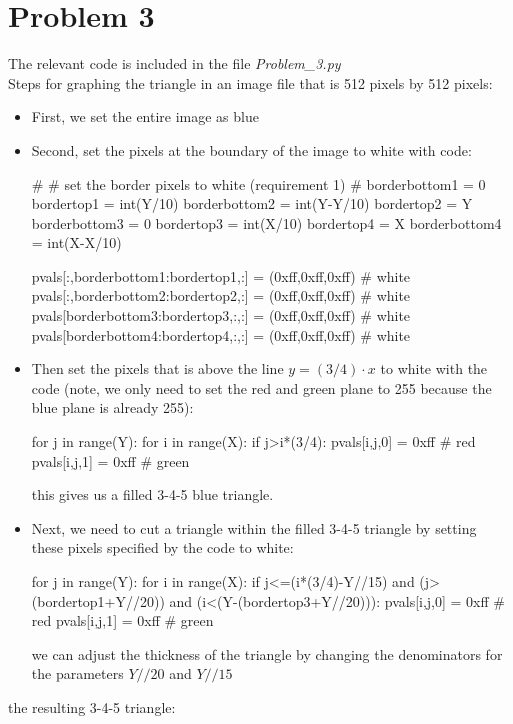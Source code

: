 \documentclass[20pt,letterpaper]{article}
\begin{document}
\section{Problem 3}
The relevant code is included in the file \textit{Problem\_3.py}\\
Steps for graphing the triangle in an image file that is 512 pixels by 512 pixels:
\begin{itemize}
	\item First, we set the entire image as blue
	\item Second, set the pixels at the boundary of the image to white with code:
	\begin{python}
		# 
		# set the border pixels to white (requirement 1)
		# 
		borderbottom1 = 0
		bordertop1 = int(Y/10)
		borderbottom2 = int(Y-Y/10)
		bordertop2 = Y
		borderbottom3 = 0
		bordertop3 = int(X/10)
		bordertop4 = X
		borderbottom4 = int(X-X/10)
		
		pvals[:,borderbottom1:bordertop1,:] = (0xff,0xff,0xff)  # white
		pvals[:,borderbottom2:bordertop2,:] = (0xff,0xff,0xff)  # white
		pvals[borderbottom3:bordertop3,:,:] = (0xff,0xff,0xff)  # white
		pvals[borderbottom4:bordertop4,:,:] = (0xff,0xff,0xff)  # white
	\end{python}
	\item Then set the pixels that is above the line $y = (3/4)\cdot x$ to white with the code (note, we only need to set the red and green plane to 255 because the blue plane is already 255):
	\begin{python}
		for j in range(Y):
			for i in range(X):
				if j>i*(3/4):
					pvals[i,j,0] = 0xff  # red
					pvals[i,j,1] = 0xff    # green
	\end{python}
	this gives us a filled 3-4-5 blue triangle.
	\item Next, we need to cut a triangle within the filled 3-4-5 triangle by setting these pixels specified by the code to white:
	\begin{python}
		for j in range(Y):
			for i in range(X):
				if j<=(i*(3/4)-Y//15) and (j>(bordertop1+Y//20)) and (i<(Y-(bordertop3+Y//20))):
					pvals[i,j,0] = 0xff  # red
					pvals[i,j,1] = 0xff  # green
	\end{python}
we can adjust the thickness of the triangle by changing the denominators for the parameters $Y//20$ and $Y//15$
\end{itemize}
the resulting 3-4-5 triangle:
\end{document}
